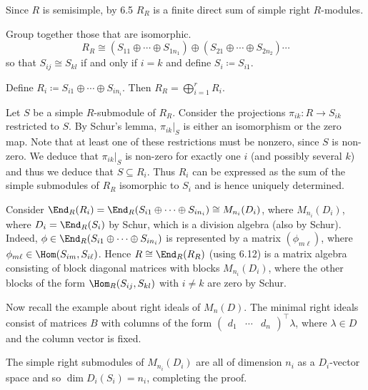 Since $R$ is semisimple, by 6.5 $R_R$ is a finite direct sum of simple
right $R$-modules.

Group together those that are isomorphic.
\[ R_R \cong (S_{11} \oplus \cdots \oplus S_{1n_1}) \oplus (S_{21}\oplus \cdots\oplus S_{2n_2}) \cdots \]
so that $S_{ij} \cong S_{kl}$ if and only if $i = k$ and define $S_i\coloneqq S_{i1}$.

Define $R_i\coloneqq S_{i1}\oplus\cdots\oplus S_{in_i}$. Then
$R_R = \bigoplus_{i=1}^r R_i$.

Let $S$ be a simple $R$-submodule of $R_R$. Consider the projections
$\pi_{ik}\colon R\to S_{ik}$ restricted to $S$. By Schur's lemma,
$\pi_{ik}|_S$ is either an isomorphism or the zero map. Note that at least
one of these restrictions must be nonzero, since $S$ is non-zero. We deduce that
$\pi_{ik}|_S$ is non-zero for exactly one $i$ (and possibly several $k$) and
thus we deduce that $S \subseteq R_i$. Thus $R_i$ can be expressed as the
sum of the simple submodules of $R_R$ isomorphic to $S_i$ and is hence uniquely
determined.

Consider $\End_R(R_i) = \End_R(S_{i1}\oplus\cdots\oplus S_{in_i}) \cong M_{n_i}(D_i)$,
where $M_{n_i}(D_i)$, where $D_i = \End_{R}(S_i)$ by Schur, which is a
division algebra (also by Schur). Indeed,  $\phi  \in \End_R(S_{i1}\oplus\cdots\oplus S_{in_i})$ is
represented by a matrix $(\phi_{m\ell})$, where $\phi_{m\ell} \in \Hom(S_{im}, S_{i\ell})$.
Hence $R\cong \End_R(R_R)$ (using 6.12) is a matrix algebra consisting of
block diagonal matrices with blocks $M_{n_i}(D_i)$, where the other blocks
of the form $\Hom_R(S_{ij}, S_{kl})$ with $i\neq k$ are zero by Schur.

Now recall the example about right ideals of $M_n(D)$. The minimal right ideals
consist of matrices $B$ with columns of the form $\begin{pmatrix}d_1 & \cdots & d_n\end{pmatrix}^\top \lambda$,
where  $\lambda \in D$ and the column vector is fixed.

The simple right submodules of $M_{n_i}(D_i)$ are all of dimension $n_i$ as a
$D_i$-vector space and so $\dim D_i(S_i) = n_i$, completing the proof.
